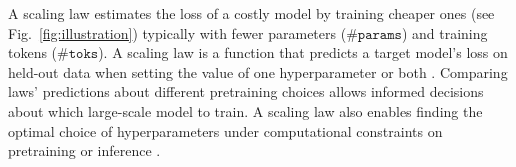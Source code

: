 \documentclass{article}
\theoremstyle{plain}
\theoremstyle{definition}
\theoremstyle{remark}
\newcommand{\mathmsize}{\#\texttt{params}}
\newcommand{\mathtokens}{\#\texttt{toks}}
\newcommand{\mathperf}{L}
\newcommand{\msize}{$\mathmsize{}$}
\newcommand{\tokens}{$\mathtokens{}$}
\newcommand{\perf}{loss}%
\begin{document}




A scaling law estimates the loss of a costly model by training cheaper ones (see Fig.~\ref{fig:illustration}) typically with fewer parameters (\msize{}) and training tokens (\tokens{}). A scaling law is a function that predicts a target model's loss on held-out data when setting the value of one hyperparameter \citep{kaplan2020scaling} or both \citep{rosenfeldconstructive,hoffmann2022training}.
Comparing laws' predictions about different pretraining choices \citep[e.g. data][]{bimix} allows informed decisions about which large-scale model to train. 
A scaling law also enables finding the optimal choice of hyperparameters under computational constraints on pretraining \citep{hoffmann2022training} or inference \citep{touvron2023llama2,sardanabeyond}. 
\end{document}
